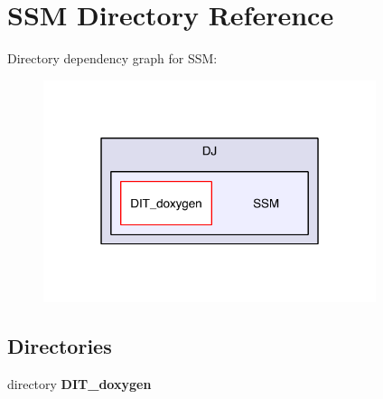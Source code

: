 \section{S\-S\-M Directory Reference}
\label{dir_535975018cac6ecbedf1d757271dec4b}
Directory dependency graph for S\-S\-M\-:\nopagebreak
\begin{figure}[H]
\begin{center}
\leavevmode
\includegraphics[width=276pt]{dir_535975018cac6ecbedf1d757271dec4b_dep}
\end{center}
\end{figure}
\subsection*{Directories}
\begin{DoxyCompactItemize}
\item 
directory {\bf D\-I\-T\-\_\-doxygen}
\end{DoxyCompactItemize}

